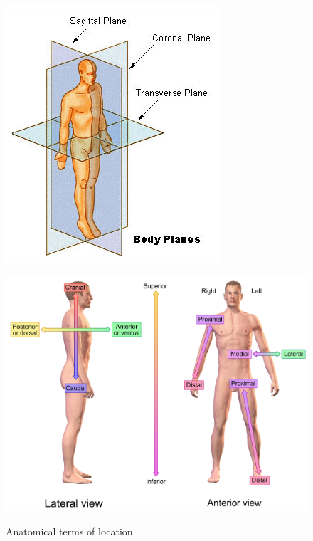 \begin{figure}[htb]
	\centering
	\begin{minipage}[t]{0.38\linewidth}
		\centering
		\includegraphics[width=1\linewidth]{Pictures/bodyPlanes}
		\label{fig:bodyPlanes}
	\end{minipage}
	\hfill
	\begin{minipage}[t]{0.6\linewidth}
		\centering
		\includegraphics[width=1\linewidth]{Pictures/bodyDirectionalReferences}
		\label{fig:bodyDirectionalReferences}
	\end{minipage}
	\caption{Anatomical terms of location~\cite{Wiki2017-ATOL}}
	\label{fig:bodyWikiAnatomicalTermsOfLocation}
\end{figure}

